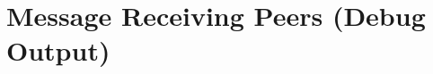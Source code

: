 \documentclass[12pt,a4paper]{report}
\begin{document}
\section{Message Receiving Peers (Debug Output)}
\label{debugoutputrecvpeers}
%
%

\end{document}
